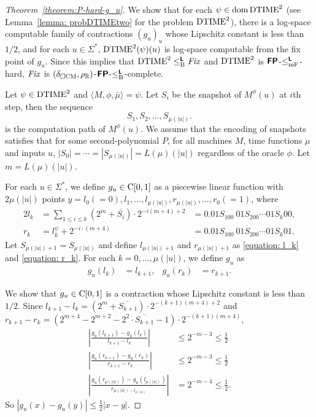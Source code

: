 \documentclass[envcountsect,envcountsame,orivec,oribibl]{llncs}
\begin{document}
\begin{proof}[Theorem~\ref{theorem:P-hard-g_u}]
 We show that for each $\psi \in \mathop{\rm dom} \mathrm{DTIME}^2$
 (see Lemma~\ref{lemma: probDTIMEtwo} for the problem $\mathrm{DTIME}^2$),
 there is a log-space computable family of contractions $(g_u)_u$ whose
 Lipschitz constant is less than $1/2$,
 and for each $u \in \Sigma^*$, $\mathrm{DTIME}^2(\psi)(u)$ is log-space 
 computable from the fix point of $g_u$.
 Since this implies that $\mathrm{DTIME}^2 \leq _{\mathrm B} ^{\text{\bfseries \sffamily \upshape L}} \mathit{Fix}$ and $\mathrm{DTIME}^2$
 is $\text{\bfseries \sffamily \upshape FP}$-$\leq _{\mathrm{mF}} ^{\text{\bfseries \sffamily \upshape L}}$-hard, $\mathit{Fix}$ is 
 $(\delta _{\square \mathrm{CM}}, \rho _\mathbb R)$-$\text{\bfseries \sffamily \upshape FP}$-$\leq _{\mathrm B} ^{\text{\bfseries \sffamily \upshape L}}$-complete.

 Let $\psi \in \mathrm{DTIME}^2$ and $\langle M, \phi, \bar \mu \rangle = \psi$.
 Let $S_i$ be the snapshot of $M^\phi(u)$ at $i$th step, then the sequence
 \begin{equation}
  S_1, S_2, \dots, S_{\mu(|u|)}.
 \end{equation}
 is the computation path of $M^\phi(u)$.
 We assume that the encoding of snapshots satisfies that 
 for some second-polynomial $P$, for all machines $M$, time functions $\mu$ 
 and inputs $u$, $|S_0| = \cdots = |S_{\mu(|u|)}| = L(\mu)(|u|)$
 regardless of the oracle $\phi$.
 Let $m = L(\mu)(|u|)$.


 For each $u \in \Sigma^*$, we define $g_u \in \mathrm C[0,1]$ as
 a piecewise linear function with $2\mu(|u|)$ points
 $y = l_0 (=0), l_1, \dots, l_{\mu(|u|)}, r_{\mu(|u|)}, \dots, r_0(=1)$,
 where
\begin{alignat}{2}
 \label{equation: l_k}
 l_k 
 &
 = \sum_{1 \le i \le k} (2^m+\overline{S_i}) \cdot 2^{-i(m+4)+2} 
 &
 = 0.01S_100\ 01S_200 \cdots 01S_k00,
 \\
 \label{equation: r_k}
 r_k
 &
 = l^\psi_k + 2^{-i \cdot (m+4)}
 &
 = 0.01S_100\ 01S_200 \cdots 01S_k01.
\end{alignat}
 Let $S_{\mu(|u|)+1} = S_{\mu(|u|)}$ and
 define $l_{\mu(|u|)+1}$ and $r_{\mu(|u|)+1}$ as
 \eqref{equation: l_k} and \eqref{equation: r_k}.
 For each $k = 0, \dots, \mu(|u|)$,
 we define $g_u$ as
 \begin{align}
 g_u(l_k) &= l_{k+1},
 &
 g_u(r_k) &= r_{k+1}.
 \end{align}

 We show that $g_u \in \mathrm C[0,1]$ is a contraction whose Lipschitz constant
 is less than $1/2$.
 Since $l_{k+1} - l_{k} = (2^m+\overline{S_{k+1}}) \cdot 2^{-(k+1)(m+4)+2} $
 and $r_{k+1} - r_{k} = (2^{m+4} - 2^{m+2} - 2^2 \cdot \overline{S_{k+1}} - 1)
 \cdot 2^{-(k+1)(m+4)} $,
\begin{align}
 \left|\frac{g_u(l_{k+1}) - g_u(l_k)}{l_{k+1} - l_k} \right| 
 &
 \le 2^{-m-3} \le \frac 1 2
 \\
 \left|\frac{g_u(r_{k+1}) - g_u(r_k)}{r_{k+1} - r_k} \right| 
 &
 \le 2^{-m-3} \le \frac 1 2
 \\
 \left|\frac{g_u(r_{\mu(|u|)}) - g_u(l_{\mu(|u|)})}{r_{\mu(|u|) - l_{\mu(|u|)}}} \right| 
 &
 = 2^{-m-4} \le \frac 1 2.
\end{align}
 So $|g_u(x) - g_u(y)| \le \frac 1 2 |x-y|$.


\end{proof}
\end{document}
